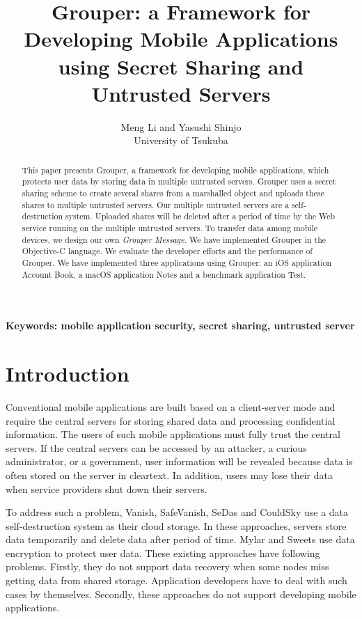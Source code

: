 \documentclass[twocolumn,10pt]{article}
\begin{document}
\title{\bf Grouper: a Framework for Developing Mobile Applications using Secret Sharing and Untrusted Servers}

\author{
	Meng Li and Yasushi Shinjo \\
	University of Tsukuba
}

\maketitle

\begin{abstract}

This paper presents Grouper, a framework for developing mobile applications, which protects user data by storing data in multiple untrusted servers.
Grouper uses a secret sharing scheme to create several shares from a marshalled object and uploads these shares to multiple untrusted servers. 
Our multiple untrusted servers are a self-destruction system.
Uploaded shares will be deleted after a period of time by the Web service running on the multiple untrusted servers.
To transfer data among mobile devices, we design our own \emph{Grouper Message}. 
We have implemented Grouper in the Objective-C language.
We evaluate the developer efforts and the performance of Grouper. 
We have implemented three applications using Grouper: an iOS application Account Book, a macOS application Notes and a benchmark application Test.

\end{abstract}

\textbf{Keywords: mobile application security, secret sharing, untrusted server}

\section{Introduction}

Conventional mobile applications are built based on a client-server mode and require the central servers for storing shared data and processing confidential information.
The users of such mobile applications must fully trust the central servers. 
If the central servers can be accessed by an attacker, a curious administrator, or a government, user information will be revealed because data is often stored on the server in cleartext. 
In addition, users may lose their data when service providers shut down their servers.

To address such a problem, Vanish\cite{geambasu2009vanish}, SafeVanish\cite{zeng2010safevanish}, SeDas\cite{zeng2012sedas} and CouldSky\cite{zeng2015cloudsky} use a data self-destruction system as their cloud storage.
In these approaches, servers store data temporarily and delete data after period of time.
Mylar\cite{popa2014building} and Sweets\cite{sweets} use data encryption to protect user data.
These existing approaches have following problems.
Firstly, they do not support data recovery when some nodes miss getting data from shared storage.
Application developers have to deal with such cases by themselves.
Secondly, these approaches do not support developing mobile applications.
\end{document}
